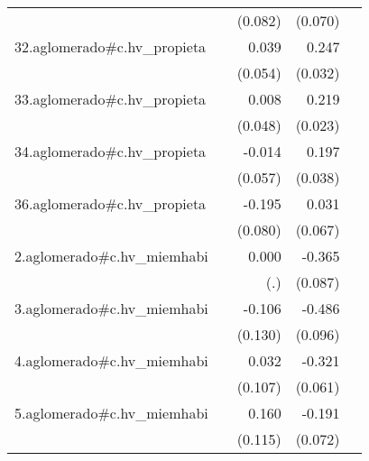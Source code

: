 {\begin{longtable}{l*{4}{D{.}{.}{-1}}}
            &                     &     (0.082)         &     (0.070)         &                     \\
\addlinespace
32.aglomerado#c.hv\_propieta&                     &       0.039         &       0.247\sym{***}&                     \\
            &                     &     (0.054)         &     (0.032)         &                     \\
\addlinespace
33.aglomerado#c.hv\_propieta&                     &       0.008         &       0.219\sym{***}&                     \\
            &                     &     (0.048)         &     (0.023)         &                     \\
\addlinespace
34.aglomerado#c.hv\_propieta&                     &      -0.014         &       0.197\sym{***}&                     \\
            &                     &     (0.057)         &     (0.038)         &                     \\
\addlinespace
36.aglomerado#c.hv\_propieta&                     &      -0.195\sym{*}  &       0.031         &                     \\
            &                     &     (0.080)         &     (0.067)         &                     \\
\addlinespace
2.aglomerado#c.hv\_miemhabi&                     &       0.000         &      -0.365\sym{***}&                     \\
            &                     &         (.)         &     (0.087)         &                     \\
\addlinespace
3.aglomerado#c.hv\_miemhabi&                     &      -0.106         &      -0.486\sym{***}&                     \\
            &                     &     (0.130)         &     (0.096)         &                     \\
\addlinespace
4.aglomerado#c.hv\_miemhabi&                     &       0.032         &      -0.321\sym{***}&                     \\
            &                     &     (0.107)         &     (0.061)         &                     \\
\addlinespace
5.aglomerado#c.hv\_miemhabi&                     &       0.160         &      -0.191\sym{**} &                     \\
            &                     &     (0.115)         &     (0.072)         &                     \\

\end{longtable}}
